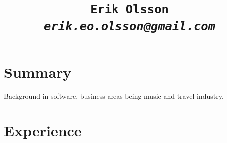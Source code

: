 \documentclass[letterpaper]{scrartcl}
\begin{document}
\title{\vspace{-6ex}\tt{Erik Olsson\\\textit{erik.eo.olsson@gmail.com}}}

%
%



%
%

\section*{Summary}
\begin{list1}
  \item Background in software, business areas being music and travel industry.
\end{list1}

\section*{Experience}
\end{document}
